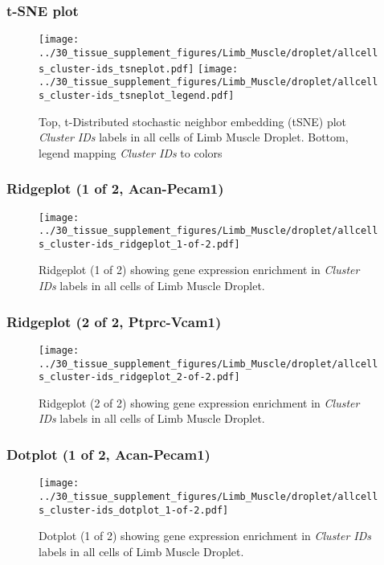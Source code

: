 \clearpage
\subsubsection{t-SNE plot}
\begin{figure}[h]
\centering
\texttt{[image: ../30\_tissue\_supplement\_figures/Limb\_Muscle/droplet/allcells\_cluster-ids\_tsneplot.pdf]}
\texttt{[image: ../30\_tissue\_supplement\_figures/Limb\_Muscle/droplet/allcells\_cluster-ids\_tsneplot\_legend.pdf]}
\caption{Top, t-Distributed stochastic neighbor embedding (tSNE) plot  \emph{Cluster IDs} labels in all cells of Limb Muscle Droplet. Bottom, legend mapping \emph{Cluster IDs} to colors}
\end{figure}


\clearpage

\subsubsection{Ridgeplot (1 of 2, Acan-Pecam1)}
\begin{figure}[h]
\centering
\texttt{[image: ../30\_tissue\_supplement\_figures/Limb\_Muscle/droplet/allcells\_cluster-ids\_ridgeplot\_1-of-2.pdf]}

\caption{ Ridgeplot (1 of 2)  showing gene expression enrichment in \emph{Cluster IDs} labels in all cells of Limb Muscle Droplet. }
\end{figure}


\clearpage

\subsubsection{Ridgeplot (2 of 2, Ptprc-Vcam1)}
\begin{figure}[h]
\centering
\texttt{[image: ../30\_tissue\_supplement\_figures/Limb\_Muscle/droplet/allcells\_cluster-ids\_ridgeplot\_2-of-2.pdf]}

\caption{ Ridgeplot (2 of 2)  showing gene expression enrichment in \emph{Cluster IDs} labels in all cells of Limb Muscle Droplet. }
\end{figure}


\clearpage

\subsubsection{Dotplot (1 of 2, Acan-Pecam1)}
\begin{figure}[h]
\centering
\texttt{[image: ../30\_tissue\_supplement\_figures/Limb\_Muscle/droplet/allcells\_cluster-ids\_dotplot\_1-of-2.pdf]}

\caption{ Dotplot (1 of 2)  showing gene expression enrichment in \emph{Cluster IDs} labels in all cells of Limb Muscle Droplet. }
\end{figure}


